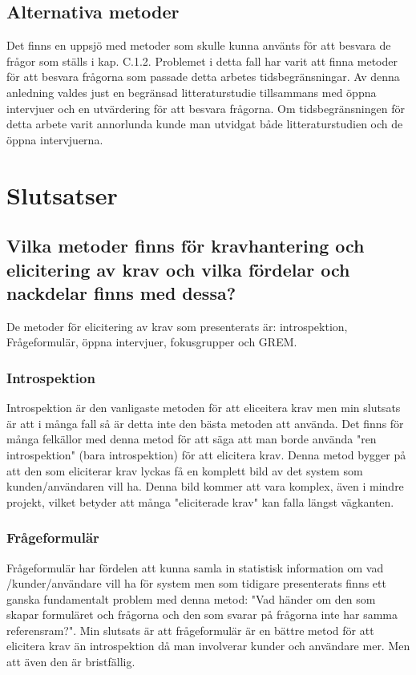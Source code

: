 \subsection{Alternativa metoder}
Det finns en uppsjö  med metoder som skulle kunna använts för att besvara de frågor som ställs i kap. C.1.2. Problemet i detta fall har varit att finna metoder för att besvara frågorna som passade detta arbetes tidsbegränsningar. Av denna anledning valdes just en begränsad litteraturstudie tillsammans med öppna intervjuer och en utvärdering för att besvara frågorna. Om tidsbegränsningen för detta arbete varit annorlunda kunde man utvidgat både litteraturstudien och de öppna intervjuerna.   
\section{Slutsatser}
\label{sec:conclusions-jannering}
\subsection{Vilka metoder finns för kravhantering och elicitering av krav och vilka fördelar och nackdelar finns med dessa?}
De metoder för elicitering av krav som presenterats är: introspektion, Frågeformulär, öppna intervjuer, fokusgrupper och GREM.

\subsubsection{Introspektion}
Introspektion är den vanligaste metoden för att eliceitera krav men min slutsats är att i många fall så är detta inte den bästa metoden att använda. Det finns för många felkällor med denna metod för att säga att man borde använda "ren introspektion" (bara introspektion) för att elicitera krav. Denna metod bygger på att den som eliciterar krav lyckas få en komplett bild av det system som kunden/användaren vill ha. Denna bild kommer att vara komplex, även i mindre projekt, vilket betyder att många "eliciterade krav" kan falla längst vägkanten.

\subsubsection{Frågeformulär}
Frågeformulär har fördelen att kunna samla in statistisk information om vad /kunder/användare vill ha för system men som tidigare presenterats finns ett ganska fundamentalt problem med denna metod: "Vad händer om den som skapar formuläret och frågorna och den som svarar på frågorna inte har samma referensram?". Min slutsats är att frågeformulär är en bättre metod för att elicitera krav än introspektion då man involverar kunder och användare mer. Men att även den är bristfällig.

